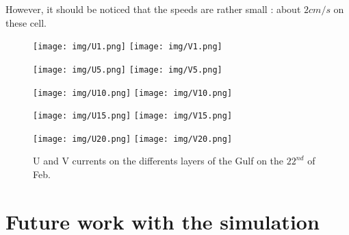 \documentclass[english]{PFeENSTA}
\begin{document}
However, it should be noticed that the speeds are rather small : about $2 cm/s$ on these cell. 
\begin{figure}[H]
   \begin{minipage}[h!]{1\linewidth}
   \centering
   \texttt{[image: img/U1.png]}
   \texttt{[image: img/V1.png]}
  \end{minipage}
   \begin{minipage}[h!]{1\linewidth}
   \centering
   \texttt{[image: img/U5.png]}
   \texttt{[image: img/V5.png]}
  \end{minipage}
   \begin{minipage}[h!]{1\linewidth}
   \centering
   \texttt{[image: img/U10.png]}
   \texttt{[image: img/V10.png]}
  \end{minipage}
   \begin{minipage}[h!]{1\linewidth}
   \centering
   \texttt{[image: img/U15.png]}
   \texttt{[image: img/V15.png]}
  \end{minipage}
   \begin{minipage}[h!]{1\linewidth}
   \centering
   \texttt{[image: img/U20.png]}
   \texttt{[image: img/V20.png]}
  \end{minipage}
 \caption{\label{fig:UV_Layers}U and V currents on the differents layers of the Gulf on the $22^{nd}$ of Feb.}
\end{figure}



\section{Future work with the simulation}
\end{document}
